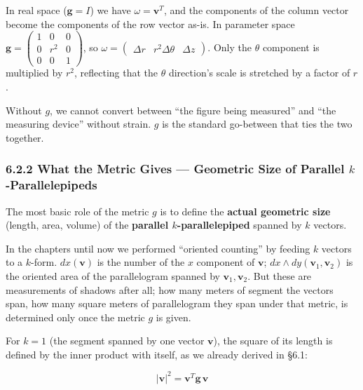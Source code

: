 In real space (\(\mathbf{g}=I\)) we have \(\omega = \mathbf{v}^T\), and
the components of the column vector become the components of the row
vector as-is. In parameter space
\(\mathbf{g} = \begin{pmatrix} 1 & 0 & 0 \\ 0 & r^2 & 0 \\ 0 & 0 & 1 \end{pmatrix}\),
so
\(\omega = \begin{pmatrix} \Delta r & r^2\Delta\theta & \Delta z \end{pmatrix}\).
Only the \(\theta\) component is multiplied by \(r^2\), reflecting that
the \(\theta\) direction's scale is stretched by a factor of \(r\).

Without \(g\), we cannot convert between ``the figure being measured''
and ``the measuring device'' without strain. \(g\) is the standard
go-between that ties the two together.

\hypertarget{what-the-metric-gives-geometric-size-of-parallel-k-parallelepipeds}{%
\subsubsection{\texorpdfstring{6.2.2 What the Metric Gives --- Geometric
Size of Parallel
\(k\)-Parallelepipeds}{6.2.2 What the Metric Gives --- Geometric Size of Parallel k-Parallelepipeds}}\label{what-the-metric-gives-geometric-size-of-parallel-k-parallelepipeds}}

The most basic role of the metric \(g\) is to define the
\textbf{actual geometric size} (length, area, volume) of the
\textbf{parallel $k$-parallelepiped} spanned by \(k\) vectors.

In the chapters until now we performed ``oriented counting'' by feeding
\(k\) vectors to a \(k\)-form. \(dx(\mathbf{v})\) is the number of the
\(x\) component of \(\mathbf{v}\);
\(dx \wedge dy(\mathbf{v}_1, \mathbf{v}_2)\) is the oriented area of the
parallelogram spanned by \(\mathbf{v}_1, \mathbf{v}_2\). But these are
measurements of shadows after all; how many meters of segment the
vectors span, how many square meters of parallelogram they span under
that metric, is determined only once the metric \(g\) is given.

For \(k=1\) (the segment spanned by one vector \(\mathbf{v}\)), the
square of its length is defined by the inner product with itself, as we
already derived in §6.1:

\[|\mathbf{v}|^2 = \mathbf{v}^T \mathbf{g} \,\mathbf{v}\]

